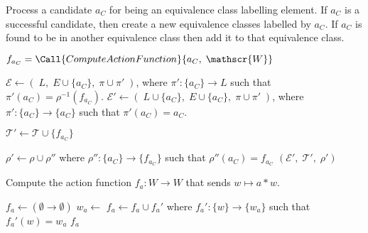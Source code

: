 \begin{algorithm}[H]
	\caption{
		Process a candidate $a_{C}$ for being an equivalence class labelling element.
		If $a_{C}$ is a successful candidate, then create a new equivalence classes labelled by $a_{C}$.
		If $a_{C}$ is found to be in another equivalence class then add it to that equivalence class.
	}
	\hrulefill
	\begin{algorithmic}[1]
		\State $f_{a_{C}} = \Call{ComputeActionFunction}{a_{C}, \; \mathscr{W}}$

		\Statex {}
		\State $\mathcal{E} \gets (\; L, \; E \cup \{a_{C}\}, \; \pi \cup \pi' \;)$, where $\pi': \{a_{C}\} \to L$ such that $\pi'(a_{C}) = \rho^{-1}(f_{a_{C}})$.
		\Else
		\Statex {}
		\State $\mathcal{E}' \gets (\; L \cup \{a_{C}\}, \; E \cup \{a_{C}\}, \; \pi \cup \pi' \;)$, where $\pi': \{a_{C}\} \to \{a_{C}\}$ such that $\pi'(a_{C}) = a_{C}$.

		\Statex {}
		\State $\mathcal{T}' \gets \mathcal{T} \cup \{f_{a_{C}}\}$

		\Statex {}
		\State $\rho' \gets \rho \cup \rho''$ where $\rho'': \{a_{C}\} \to \{f_{a_{C}}\}$ such that $\rho''(a_{C}) = f_{a_{C}}$
		\EndIf
		\State \Return $(\mathcal{E}', \; \mathcal{T}', \; \rho')$
		\EndProcedure
	\end{algorithmic}
\end{algorithm}



\begin{algorithm}[H]
	\caption{Compute the action function $f_{a}: W \to W$ that sends $w \mapsto a \ast w$.}
        \label{alg:ComputeActionFunction}
	\hrulefill
	\begin{algorithmic}[1]
		\State $f_{a} \gets (\emptyset \to \emptyset)$
		\State $w_{a} \gets$ 
		\State $f_{a} \gets f_{a} \cup f_{a}'$ where $f_{a}': \{w\} \to \{w_{a}\}$ such that $f_{a}'(w) = w_{a}$
		\EndFor
		\State \Return $f_{a}$
		\EndProcedure
	\end{algorithmic}
\end{algorithm}


